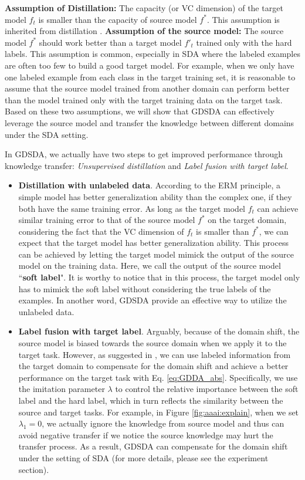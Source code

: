 \textbf{Assumption of Distillation:} The capacity (or VC dimension) of the target model $f_t$ is smaller than the capacity of source model $f^*$. This assumption is inherited from distillation \cite{lopez2015unifying}.
\textbf{Assumption of the source model:} The source model $f^*$ should work better than a target model $f'_t$ trained only with the hard labels. This assumption is common, especially in SDA where the labeled examples are often too few to build a good target model. For example, when we only have one labeled example from each class in the target training set, it is reasonable to assume that the source model trained from another domain can perform better than the model trained only with the target training data on the target task. Based on these two assumptions, we will show that GDSDA can effectively leverage the source model and transfer the knowledge between different domains under the SDA setting.

In GDSDA, we actually have two steps to get improved performance through knowledge transfer: \textit{Unsupervised distillation} and \textit{Label fusion with target label}.
\begin{itemize}
	\item \textbf{Distillation with unlabeled data}. According to the ERM principle\cite{vapnik1999overview}, a simple model has better generalization ability than the complex one, if they both have the same training error.
	As long as the target model $f_t$ can achieve similar training error to that of the source model $f^*$ on the target domain, considering the fact that the VC dimension of $f_t$ is smaller than $f^*$, we can expect that the target model has better generalization ability. This process can be achieved by letting the target model mimick the output of the source model on the training data. Here, we call the output of the source model ``\textbf{soft label}".
	It is worthy to notice that in this process, the target model only has to mimick the soft label without considering the true labels of the examples. In another word, GDSDA provide an effective way to utilize the unlabeled data.
	\item \textbf{Label fusion with target label}. Arguably, because of the domain shift, the source model is biased towards the source domain when we apply it to the target task. However, as suggested in \cite{hinton2015distilling}, we can use labeled information from the target domain to compensate for the domain shift and achieve a better performance on the target task with Eq. \eqref{eq:GDDA_abs}. Specifically, we use the imitation parameter $\lambda$ to control the relative importance between the soft label and the hard label, which in turn reflects the similarity between the source and target tasks. 
	For example, in Figure \ref{fig:aaai:explain}, when we set $\lambda_1=0$, we actually ignore the knowledge from source model and thus can avoid negative transfer if we notice the source knowledge may hurt the transfer process.
	As a result, GDSDA can compensate for the domain shift under the setting of SDA (for more details, please see the experiment section).
\end{itemize}




